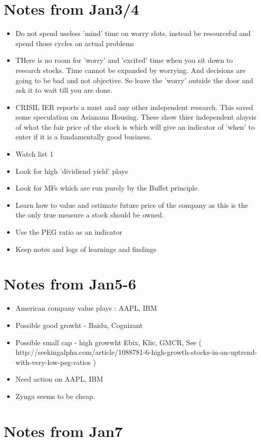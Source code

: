 \documentclass[a4paper]{article}
\begin{document}
\section{Notes from Jan3/4}
\begin{itemize}
  \item Do not spend useless 'mind' time on worry slots, instead be resourceful and spend those cycles on actual problems
  \item THere is no room for 'worry' and 'excited' time when you sit down to research stocks. Time cannot be expanded by worrying. And decisions are going to be bad and not objective. So leave the 'worry' outside the door and ask it to wait till you are done.
  \item CRISIL IER reports a must and any other independent research. This saved some speculation on Asianana Housing. These show thier independent alaysis of what the fair price of the stock is which will give an indicator of 'when' to enter if it is a fundamentally good business.
  \item Watch list 1
  \item Look for high 'dividiend yield' plays
  \item Look for MFs which are run purely by the Buffet principle.
  \item Learn how to value and estimate future price of the company as this is the the only true measure a stock should be owned.
  \item Use the PEG ratio as an indicator
  \item Keep notes and logs of learnings and findings
\end{itemize}

\section{Notes from Jan5-6}
\begin{itemize}
  \item American company value plays : AAPL, IBM
  \item Possible good growht - Baidu, Cognizant
  \item Possible small cap - high growwht Ebix, Klic, GMCR, See ( http://seekingalpha.com/article/1088781-6-high-growth-stocks-in-an-uptrend-with-very-low-peg-ratios )
  \item Need action on AAPL, IBM
  \item Zynga seems to be cheap.
\end{itemize}

\section{Notes from Jan7}
\end{document}
